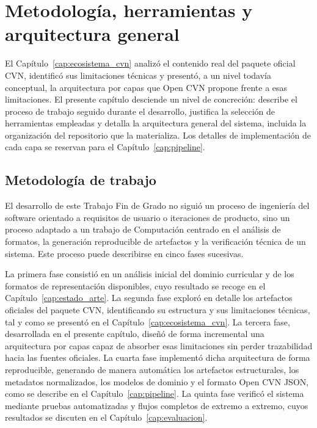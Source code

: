\chapter{Metodología, herramientas y arquitectura general}
\label{cap:metodologia}

El Capítulo~\ref{cap:ecosistema_cvn} analizó el contenido real del paquete
oficial CVN, identificó sus limitaciones técnicas y presentó, a un nivel
todavía conceptual, la arquitectura por capas que Open CVN propone frente a
esas limitaciones. El presente capítulo desciende un nivel de concreción:
describe el proceso de trabajo seguido durante el desarrollo, justifica la
selección de herramientas empleadas y detalla la arquitectura general del
sistema, incluida la organización del repositorio que la materializa. Los
detalles de implementación de cada capa se reservan para el
Capítulo~\ref{cap:pipeline}.

\section{Metodología de trabajo}
\label{sec:metodologia_proceso}

El desarrollo de este Trabajo Fin de Grado no siguió un proceso de ingeniería
del software orientado a requisitos de usuario o iteraciones de producto, sino
un proceso adaptado a un trabajo de Computación centrado en el análisis de
formatos, la generación reproducible de artefactos y la verificación técnica de
un sistema. Este proceso puede describirse en cinco fases sucesivas.

La primera fase consistió en un análisis inicial del dominio curricular y de
los formatos de representación disponibles, cuyo resultado se recoge en el
Capítulo~\ref{cap:estado_arte}. La segunda fase exploró en detalle los
artefactos oficiales del paquete CVN, identificando su estructura y sus
limitaciones técnicas, tal y como se presentó en el
Capítulo~\ref{cap:ecosistema_cvn}. La tercera fase, desarrollada en el presente
capítulo, diseñó de forma incremental una arquitectura por capas capaz de
absorber esas limitaciones sin perder trazabilidad hacia las fuentes
oficiales. La cuarta fase implementó dicha arquitectura de forma reproducible,
generando de manera automática los artefactos estructurales, los metadatos
normalizados, los modelos de dominio y el formato Open CVN JSON, como se
describe en el Capítulo~\ref{cap:pipeline}. La quinta fase verificó el
sistema mediante pruebas automatizadas y flujos completos de extremo a
extremo, cuyos resultados se discuten en el Capítulo~\ref{cap:evaluacion}.

